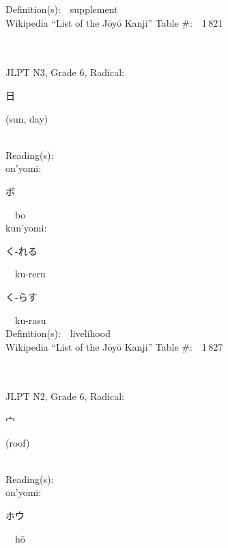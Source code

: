 \begin{multicols}{2}
Definition(s):\ \ supplement \\
Wikipedia ``List of the J\=oy\=o Kanji'' Table \#:\ \ 1\,821 \\
\ \ \\
{\fontsize{34pt}{40pt}  }\ \ \\  %
{JLPT N3, Grade 6, Radical:\ \ {\begin{CJK}{UTF8}{min} 日 \end{CJK}} (sun, day) } \\
Reading(s):\ \ \\
{\hspace*{1em}}on'yomi:\ \ \\
{\hspace*{2em}}{\begin{CJK}{UTF8}{min} ボ \end{CJK}}\ \ bo\ \ \\
{\hspace*{1em}}kun'yomi:\ \ \\
{\hspace*{2em}}{\begin{CJK}{UTF8}{min} く-れる \end{CJK}}\ \ ku-reru\ \ \\
{\hspace*{2em}}{\begin{CJK}{UTF8}{min} く-らす \end{CJK}}\ \ ku-rasu\ \ \\
Definition(s):\ \ livelihood \\
Wikipedia ``List of the J\=oy\=o Kanji'' Table \#:\ \ 1\,827 \\
\ \ \\
{\fontsize{34pt}{40pt}  }\ \ \\  %
{JLPT N2, Grade 6, Radical:\ \ {\begin{CJK}{UTF8}{min} 宀 \end{CJK}} (roof) } \\
Reading(s):\ \ \\
{\hspace*{1em}}on'yomi:\ \ \\
{\hspace*{2em}}{\begin{CJK}{UTF8}{min} ホウ \end{CJK}}\ \ h\=o\ \ \\

\end{multicols}
